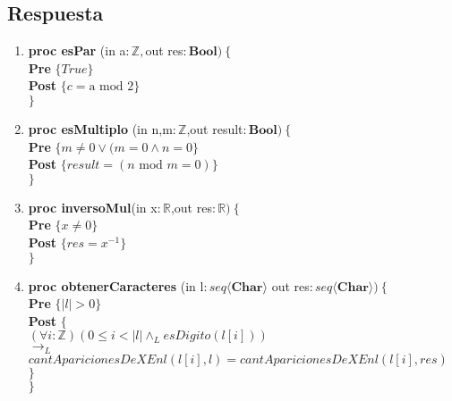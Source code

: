 \documentclass[a4paper]{article}
\begin{document}
\subsection*{Respuesta}
	\begin{enumerate}[label=\alph*)]
		\item
			
			\textbf{proc esPar }(in a$: \mathbb{Z},$out res$: \textbf{Bool})\ \{$\smallskip \\
			\hspace*{6mm} \textbf{Pre }$\{True\}$\smallskip \\
			\hspace*{6mm} \textbf{Post }$\{c=\textrm{a mod }2\}$\\
			$\}$
			
		\item
		
			\textbf{proc esMultiplo }(in n,m$: \mathbb{Z}$,out result$:\textbf{Bool})
			\ \{$\smallskip \\
			\hspace*{6mm} \textbf{Pre }$\{m \neq 0 \vee (m=0\wedge n=0\}$\smallskip \\
			\hspace*{6mm} \textbf{Post }$\{result=(n\textrm{ mod }m=0)\}$\\
			$\}$
		
		\item
			
			\textbf{proc inversoMul}(in x$: \mathbb{R}$,out res$: \mathbb{R})\ \{$\smallskip \\
			\hspace*{6mm} \textbf{Pre }$\{x \neq 0\}$\smallskip \\
			\hspace*{6mm} \textbf{Post }$\{res=x^{-1}\}$\\
			$\}$
			
		\item
		
			\textbf{proc obtenerCaracteres }(in l$: seq\langle \textbf{Char}\rangle$
			out res$: seq\langle \textbf{Char}\rangle)\ \{$\smallskip \\
			\hspace*{6mm} \textbf{Pre }$\{|l|>0\}$\smallskip \\
			\hspace*{6mm} \textbf{Post }$\{$\\
			\hspace*{6mm}$(\forall i:\mathbb{Z})(0\leq i < |l|\wedge_L esDigito(l[i]))$\\
			\hspace*{6mm}$\rightarrow_L$\\
			\hspace*{6mm}$cantAparicionesDeXEnl(l[i],l)=cantAparicionesDeXEnl(l[i],res)$\\
			\hspace*{6mm}$\}$\\
			$\}$\smallskip \\
			

\end{enumerate}
\end{document}

